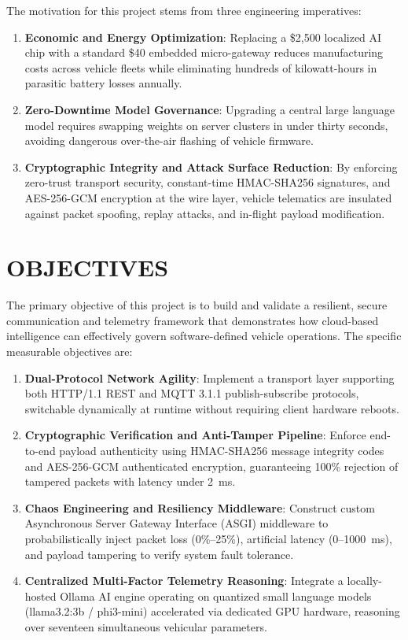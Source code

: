 \documentclass[12pt,a4paper]{report}
\begin{document}
The motivation for this project stems from three engineering imperatives:
\begin{enumerate}[leftmargin=1.2cm, itemsep=0.4em]
    \item \textbf{Economic and Energy Optimization}: Replacing a \$2,500 localized AI chip with a standard \$40 embedded micro-gateway reduces manufacturing costs across vehicle fleets while eliminating hundreds of kilowatt-hours in parasitic battery losses annually.
    \item \textbf{Zero-Downtime Model Governance}: Upgrading a central large language model requires swapping weights on server clusters in under thirty seconds, avoiding dangerous over-the-air flashing of vehicle firmware.
    \item \textbf{Cryptographic Integrity and Attack Surface Reduction}: By enforcing zero-trust transport security, constant-time HMAC-SHA256 signatures, and AES-256-GCM encryption at the wire layer, vehicle telematics are insulated against packet spoofing, replay attacks, and in-flight payload modification.
\end{enumerate}

\section{OBJECTIVES}
The primary objective of this project is to build and validate a resilient, secure communication and telemetry framework that demonstrates how cloud-based intelligence can effectively govern software-defined vehicle operations. The specific measurable objectives are:
\begin{enumerate}[leftmargin=1.2cm, itemsep=0.4em]
    \item \textbf{Dual-Protocol Network Agility}: Implement a transport layer supporting both HTTP/1.1 REST and MQTT 3.1.1 publish-subscribe protocols, switchable dynamically at runtime without requiring client hardware reboots.
    \item \textbf{Cryptographic Verification and Anti-Tamper Pipeline}: Enforce end-to-end payload authenticity using HMAC-SHA256 message integrity codes and AES-256-GCM authenticated encryption, guaranteeing 100\% rejection of tampered packets with latency under 2~ms.
    \item \textbf{Chaos Engineering and Resiliency Middleware}: Construct custom Asynchronous Server Gateway Interface (ASGI) middleware to probabilistically inject packet loss (0\%--25\%), artificial latency (0--1000~ms), and payload tampering to verify system fault tolerance.
    \item \textbf{Centralized Multi-Factor Telemetry Reasoning}: Integrate a locally-hosted Ollama AI engine operating on quantized small language models (llama3.2:3b / phi3-mini) accelerated via dedicated GPU hardware, reasoning over seventeen simultaneous vehicular parameters.
\end{enumerate}
\end{document}
